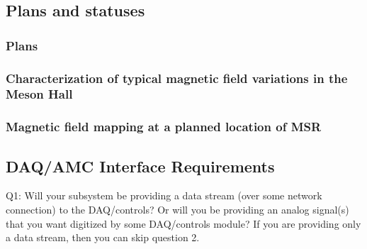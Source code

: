 



\subsection{Plans and statuses}
\subsubsection{Plans}
\subsubsection{Characterization of typical magnetic field variations in the Meson Hall}\label{sec:AMC-variation}
\subsubsection{Magnetic field mapping at a planned location of MSR}


\subsection{DAQ/AMC Interface Requirements}

Q1: Will your subsystem be providing a data stream (over some network connection) to the DAQ/controls?  Or will you be providing an analog signal(s) that you want digitized by some DAQ/controls module? 
If you are providing only a data stream, then you can skip question 2.


